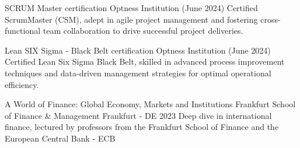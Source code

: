 
\begin{cventries}
  \cventry
  {SCRUM Master certification} %
  {Optness Institution} %
  {}
  {} %
  {(June 2024)} %
  {
    Certified ScrumMaster (CSM), adept in agile project management and fostering cross-functional team collaboration to drive successful project deliveries.
  }

  \cventry
  {Lean SIX Sigma - Black Belt certification} %
  {Optness Institution} %
  {}
  {} %
  {(June 2024)} %
  {
    Certified Lean Six Sigma Black Belt, skilled in advanced process improvement techniques and data-driven management strategies for optimal operational efficiency.
  }

  \cventry
  {A World of Finance: Global Economy, Markets and Institutions} %
  {Frankfurt School of Finance \& Management} %
  {}
  {Frankfurt - DE} %
  {2023} %
  {
    Deep dive in international finance, lectured by professors from the Frankfurt School of Finance and the European Central Bank - ECB
  }

\end{cventries}
